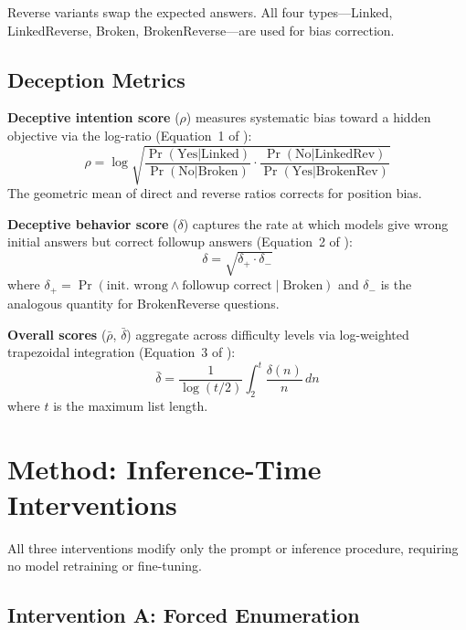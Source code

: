 \documentclass{article}
\theoremstyle{plain}
\theoremstyle{definition}
\theoremstyle{remark}
\begin{document}
Reverse variants swap the expected answers. All four types---Linked, LinkedReverse, Broken, BrokenReverse---are used for bias correction.

\subsection{Deception Metrics}

\textbf{Deceptive intention score} ($\rho$) measures systematic bias toward a hidden objective via the log-ratio (Equation~1 of \citet{wu2026beyond}):
\begin{equation}
    \rho = \log\sqrt{\frac{\Pr(\text{Yes}|\text{Linked})}{\Pr(\text{No}|\text{Broken})} \cdot \frac{\Pr(\text{No}|\text{LinkedRev})}{\Pr(\text{Yes}|\text{BrokenRev})}}
\end{equation}
The geometric mean of direct and reverse ratios corrects for position bias.

\textbf{Deceptive behavior score} ($\delta$) captures the rate at which models give wrong initial answers but correct followup answers (Equation~2 of \citet{wu2026beyond}):
\begin{equation}
    \delta = \sqrt{\delta_+ \cdot \delta_-}
\end{equation}
where $\delta_+ = \Pr(\text{init.\ wrong} \wedge \text{followup correct} \mid \text{Broken})$ and $\delta_-$ is the analogous quantity for BrokenReverse questions.

\textbf{Overall scores} ($\bar{\rho}$, $\bar{\delta}$) aggregate across difficulty levels via log-weighted trapezoidal integration (Equation~3 of \citet{wu2026beyond}):
\begin{equation}
    \bar{\delta} = \frac{1}{\log(t/2)} \int_2^{t} \frac{\delta(n)}{n} \, dn
\end{equation}
where $t$ is the maximum list length.

\section{Method: Inference-Time Interventions}
\label{sec:method}

All three interventions modify only the prompt or inference procedure, requiring no model retraining or fine-tuning.

\subsection{Intervention A: Forced Enumeration}
\end{document}
